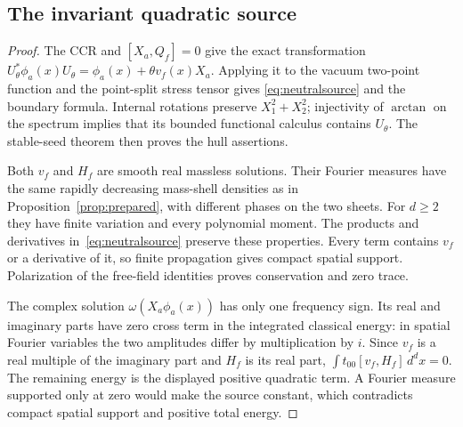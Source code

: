 \documentclass[12pt]{article}
\theoremstyle{definition}
\theoremstyle{remark}
\begin{document}
\subsection{The invariant quadratic source}
\label{app:prop:neutral}
\begin{proof}
The CCR and \([X_a,Q_f]=0\) give the exact transformation
\(U_\theta^*\phi_a(x)U_\theta=\phi_a(x)+\theta v_f(x)X_a\).
Applying it to the vacuum two-point function and the point-split stress tensor gives
\eqref{eq:neutralsource} and the boundary formula. Internal rotations preserve
\(X_1^2+X_2^2\); injectivity of \(\arctan\) on the spectrum implies that its bounded
functional calculus contains \(U_\theta\). The stable-seed theorem then proves the
hull assertions.

Both \(v_f\) and \(H_f\) are smooth real massless solutions. Their Fourier measures
have the same rapidly decreasing mass-shell densities as in
Proposition~\ref{prop:prepared}, with different phases on the two sheets. For
\(d\ge2\) they have finite variation and every polynomial moment. The products and
derivatives in~\eqref{eq:neutralsource} preserve these properties. Every term contains
\(v_f\) or a derivative of it, so finite propagation gives compact spatial support.
Polarization of the free-field identities proves conservation and zero trace.

The complex solution \(\omega(X_a\phi_a(x))\) has only one frequency sign.
Its real and imaginary parts have zero cross term in the integrated classical energy: in spatial Fourier variables
the two amplitudes differ by multiplication by \(i\). Since \(v_f\) is a real
multiple of the imaginary part and \(H_f\) is its real part,
\(\int t_{00}[v_f,H_f]\,d^dx=0\). The remaining energy is the displayed positive
quadratic term. A Fourier measure supported only at zero would make the source
constant, which contradicts compact spatial support and positive total energy.
\end{proof}
\end{document}
